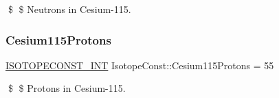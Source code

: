 \$ \$ Neutrons in Cesium-\/115. \mbox{\label{group___isotope_const-_cesium-_cs115_ga8c7ed23c6beb2b226ffbdd921d7bddd7}} 
\subsubsection{\texorpdfstring{Cesium115\+Protons}{Cesium115Protons}}
{\footnotesize\ttfamily \mbox{\hyperlink{group___isotope_const-_macros_ga5f18360b3e99483a35c32d789e62621c}{I\+S\+O\+T\+O\+P\+E\+C\+O\+N\+S\+T\+\_\+\+I\+NT}} Isotope\+Const\+::\+Cesium115\+Protons = 55}

\$ \$ Protons in Cesium-\/115. 